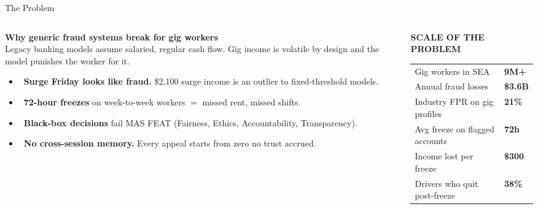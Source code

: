 \documentclass[aspectratio=169,xcolor={dvipsnames,table}]{beamer}
\begin{document}
\begin{frame}[t]{The Problem}
  \begin{columns}[T,onlytextwidth]
    \begin{column}{0.54\textwidth}
      {\color{GrabWhite}\bfseries\large Why generic fraud systems break for gig workers}\\[0.4em]
      {\color{GrabGray}\scriptsize Legacy banking models assume salaried, regular cash flow.
      Gig income is volatile by design \textemdash{} and the model punishes the worker for it.}
      \vspace{0.3em}

      \begin{itemize}\footnotesize\setlength\itemsep{0.2em}
        \item \textcolor{GrabRed}{\faExclamationTriangle}\,
              \textbf{Surge Friday looks like fraud.} \$2{,}100 surge income is an outlier to fixed-threshold models.
        \item \textcolor{GrabRed}{\faExclamationTriangle}\,
              \textbf{72-hour freezes} on week-to-week workers $=$ missed rent, missed shifts.
        \item \textcolor{GrabRed}{\faExclamationTriangle}\,
              \textbf{Black-box decisions} fail MAS FEAT (Fairness, Ethics, Accountability, Transparency).
        \item \textcolor{GrabRed}{\faExclamationTriangle}\,
              \textbf{No cross-session memory.} Every appeal starts from zero \textemdash{} no trust accrued.
      \end{itemize}
    \end{column}

    \begin{column}{0.43\textwidth}
      {\color{GrabGreen}\bfseries\small SCALE OF THE PROBLEM}\\[0.25em]
      \renewcommand{\arraystretch}{1.15}
      \scriptsize
      \begin{tabular}{>{\color{GrabGray}}l >{\raggedleft\arraybackslash\color{GrabWhite}\bfseries}p{2.2cm}}
        \toprule
        Gig workers in SEA & 9M+ \\
        Annual fraud losses & \$3.6B \\
        Industry FPR on gig profiles & 21\% \\
        Avg freeze on flagged accounts & 72h \\
        Income lost per freeze & \$300\textendash 500 \\
        Drivers who quit post-freeze & 38\% \\
        \bottomrule
      \end{tabular}
      \normalsize
      \vspace{0.4em}


\end{column}
\end{columns}
\end{frame}
\end{document}
